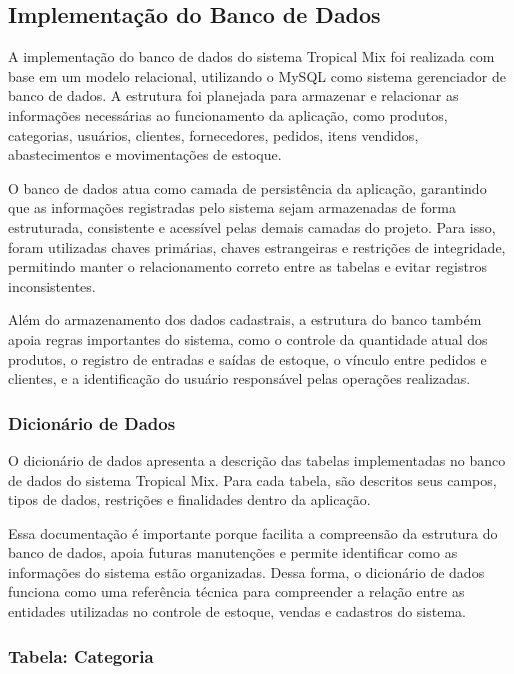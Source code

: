 \subsection{Implementação do Banco de Dados}

A implementação do banco de dados do sistema Tropical Mix foi realizada com base em um modelo relacional, utilizando o MySQL como sistema gerenciador de banco de dados. A estrutura foi planejada para armazenar e relacionar as informações necessárias ao funcionamento da aplicação, como produtos, categorias, usuários, clientes, fornecedores, pedidos, itens vendidos, abastecimentos e movimentações de estoque.

O banco de dados atua como camada de persistência da aplicação, garantindo que as informações registradas pelo sistema sejam armazenadas de forma estruturada, consistente e acessível pelas demais camadas do projeto. Para isso, foram utilizadas chaves primárias, chaves estrangeiras e restrições de integridade, permitindo manter o relacionamento correto entre as tabelas e evitar registros inconsistentes.

Além do armazenamento dos dados cadastrais, a estrutura do banco também apoia regras importantes do sistema, como o controle da quantidade atual dos produtos, o registro de entradas e saídas de estoque, o vínculo entre pedidos e clientes, e a identificação do usuário responsável pelas operações realizadas.

\subsubsection{Dicionário de Dados}

O dicionário de dados apresenta a descrição das tabelas implementadas no banco de dados do sistema Tropical Mix. Para cada tabela, são descritos seus campos, tipos de dados, restrições e finalidades dentro da aplicação.

Essa documentação é importante porque facilita a compreensão da estrutura do banco de dados, apoia futuras manutenções e permite identificar como as informações do sistema estão organizadas. Dessa forma, o dicionário de dados funciona como uma referência técnica para compreender a relação entre as entidades utilizadas no controle de estoque, vendas e cadastros do sistema.

\subsubsection{Tabela: Categoria}


